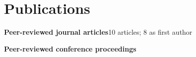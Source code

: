 \documentclass[10pt,a4paper]{article}
\begin{document}


\newpage
\section{Publications}
\textbf{Peer-reviewed journal articles}\hfill 10 articles; 8 as first author
\begingroup\small
\begin{enumerate}[leftmargin=1.9em,label=\arabic*.,itemsep=6pt,topsep=5pt]

\end{enumerate}
\vspace{4pt}
\textbf{Peer-reviewed conference proceedings}
\begin{enumerate}[leftmargin=1.9em,label=\arabic*.,itemsep=6pt,topsep=5pt]

\end{enumerate}
\endgroup
\end{document}
